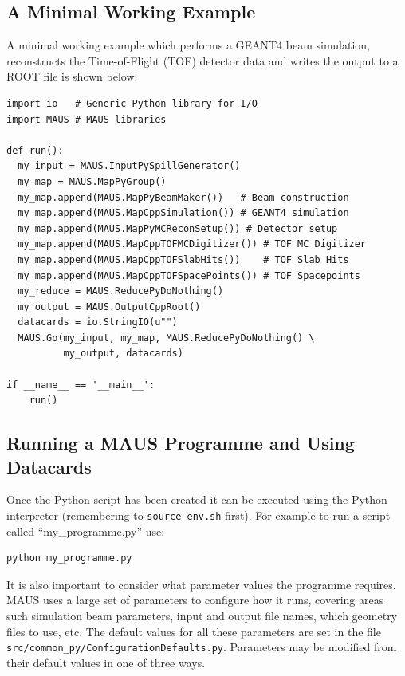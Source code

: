 \documentclass[a4paper,10pt]{article}
\begin{document}
  \subsection{A Minimal Working Example}
    A minimal working example which performs a GEANT4 beam simulation, reconstructs the Time-of-Flight (TOF) detector data and writes the output to a ROOT file is shown below:
    \begin{lstlisting}
import io   # Generic Python library for I/O
import MAUS # MAUS libraries

def run():
  my_input = MAUS.InputPySpillGenerator()
  my_map = MAUS.MapPyGroup()
  my_map.append(MAUS.MapPyBeamMaker())   # Beam construction
  my_map.append(MAUS.MapCppSimulation()) # GEANT4 simulation
  my_map.append(MAUS.MapPyMCReconSetup()) # Detector setup
  my_map.append(MAUS.MapCppTOFMCDigitizer()) # TOF MC Digitizer
  my_map.append(MAUS.MapCppTOFSlabHits())    # TOF Slab Hits
  my_map.append(MAUS.MapCppTOFSpacePoints()) # TOF Spacepoints
  my_reduce = MAUS.ReducePyDoNothing()
  my_output = MAUS.OutputCppRoot()
  datacards = io.StringIO(u"")
  MAUS.Go(my_input, my_map, MAUS.ReducePyDoNothing() \
          my_output, datacards)

if __name__ == '__main__':
    run() 
    \end{lstlisting}

\lstset{style=custombash}

  \subsection{Running a MAUS Programme and Using Datacards}
  \label{sec:RunningAProgramme}
    Once the Python script has been created it can be executed using the Python interpreter (remembering to \texttt{source env.sh} first). For example to run a script called ``my\_programme.py'' use:
   \begin{lstlisting}
python my_programme.py
    \end{lstlisting}
    
    It is also important to consider what parameter values the programme requires.  MAUS uses a large set of parameters to configure how it runs, covering areas such simulation beam parameters, input and output file names, which geometry files to use, etc.  The default values for all these parameters are set in the file \texttt{src/common\_py/ConfigurationDefaults.py}. Parameters may be modified from their default values in one of three ways. 
    
\end{document}

